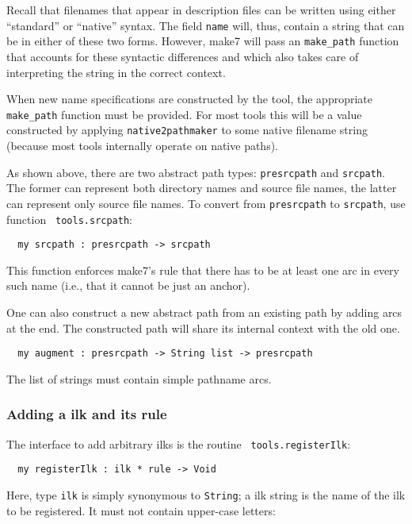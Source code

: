 Recall that filenames that appear in description files can be written
using either ``standard'' or ``native'' syntax.  The field {\tt name}
will, thus, contain a string that can be in either of these two forms.
However, make7 will pass an {\tt make_path} function that accounts for these
syntactic differences and which also takes care of interpreting the
string in the correct context.

When new name specifications are constructed by the tool, the
appropriate {\tt make_path} function must be provided.  For most tools
this will be a value constructed by applying {\tt native2pathmaker} to
some native filename string (because most tools internally operate on
native paths).

As shown above, there are two abstract path types: {\tt presrcpath}
and {\tt srcpath}.  The former can represent both directory names and
source file names, the latter can represent only source file names.
To convert from {\tt presrcpath} to {\tt srcpath}, use function {\tt
tools.srcpath}:
\begin{verbatim}
  my srcpath : presrcpath -> srcpath
\end{verbatim}
This function enforces make7's rule that there has to be at least one arc
in every such name (i.e., that it cannot be just an anchor).

One can also construct a new abstract path from an existing path by
adding arcs at the end.  The constructed path will share its internal
context with the old one.

\begin{verbatim}
  my augment : presrcpath -> String list -> presrcpath
\end{verbatim}

The list of strings must contain simple pathname arcs.

\subsubsection{Adding a ilk and its rule}

The interface to add arbitrary ilks is the routine {\tt
tools.registerIlk}:

\begin{verbatim}
  my registerIlk : ilk * rule -> Void
\end{verbatim}

Here, type {\tt ilk} is simply synonymous to {\tt String}; a ilk
string is the name of the ilk to be registered.  It must not contain
upper-case letters:

